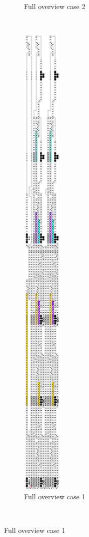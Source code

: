 \begin{figure}[H]
\begin{subfigure}[t]{0.2\textwidth}
            \caption{\label{fig:full_overview_case2_colored} Full overview case 2}
        \end{subfigure}%
        ~
        \begin{subfigure}[t]{0.2\textwidth}
            \centering
            \includegraphics[width=0.2\textwidth]{full_overview_case1_colored}
            \caption{\label{fig:full_overview_case1_colored} Full overview case 1}
        \end{subfigure}%
        ~
    \end{figure}